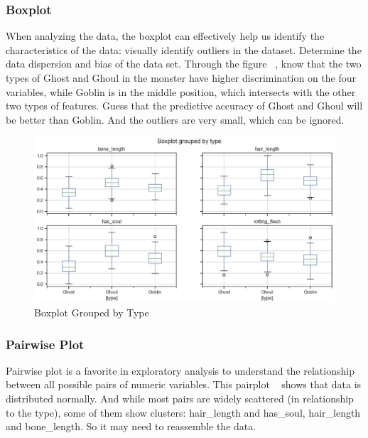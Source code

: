 \subsubsection{Boxplot}

 
When analyzing the data, 
the boxplot can effectively 
help us identify the characteristics of the data: 
visually identify outliers in the dataset. 
Determine the data dispersion and 
bias of the data set. 
Through the figure ~, 
know that the two types of Ghost and Ghoul 
in the monster have higher discrimination 
on the four variables, 
while Goblin is in the middle position, 
which intersects with the other two types of features.
Guess that the predictive accuracy of Ghost and Ghoul 
will be better than Goblin.
And the outliers are very small,
which can be ignored.


\begin{figure}[htbp]
	\centering
	
	\includegraphics[scale=0.3]{figures/boxplot.eps}
	\caption{Boxplot Grouped by Type}\label{fig:boxplot}
\end{figure}


\subsubsection{Pairwise Plot} 


Pairwise plot is 
a favorite in exploratory analysis 
to understand the relationship 
between all possible pairs 
of numeric variables. 
This pairplot ~ 
shows that data is distributed normally. 
And while most pairs are widely scattered 
(in relationship to the type), 
some of them show clusters: 
hair_length and has_soul, 
hair_length and bone_length. 
So it may need to reassemble the data.

